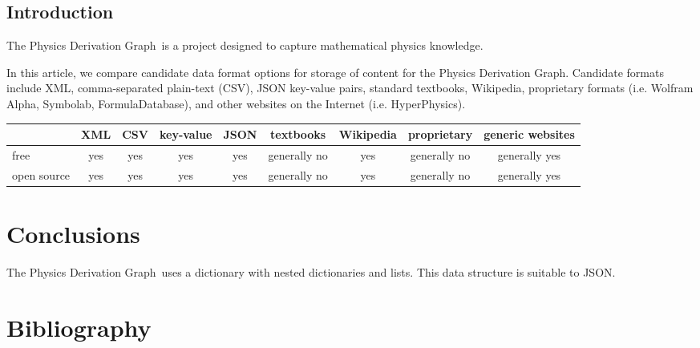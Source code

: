\documentclass{article}
\newcommand{\pdg}{Physics Derivation Graph}
\begin{document}
\begin{multicols}{2}

\section{Introduction}

The \pdg\ is a project designed to capture mathematical physics knowledge. 


In this article, we compare candidate data format options for storage of content for the \pdg. 
Candidate formats include XML\cite{2008_XML}, comma-separated plain-text (CSV), JSON key-value pairs, standard textbooks, Wikipedia, proprietary formats (i.e. Wolfram Alpha, Symbolab, FormulaDatabase), and other websites on the Internet (i.e. HyperPhysics). 
\end{multicols}
\begin{tabular}{|l|c|c|c|c|c|c|c|c|}\hline
                     & XML & CSV & key-value & JSON & textbooks     & Wikipedia & proprietary   & generic websites \\\hline
free               & yes  & yes   & yes           & yes     & generally no & yes           & generally no & generally yes \\\hline
open source & yes   & yes  & yes            & yes    & generally no & yes            & generally no & generally yes \\\hline
\end{tabular}
\begin{multicols}{2}

\section{Conclusions}
The \pdg\ uses a dictionary with nested dictionaries and lists. This data structure is suitable to JSON.

\section{Bibliography}


\end{multicols}

%
\end{document}
